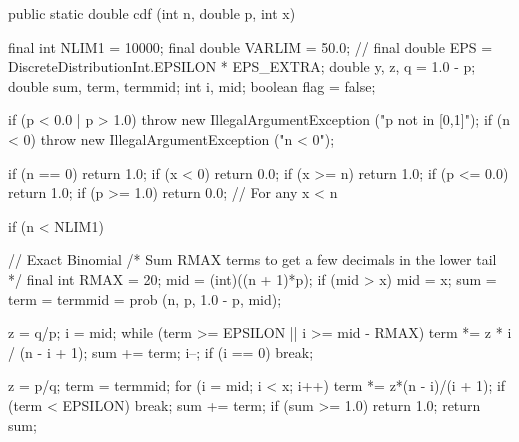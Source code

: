 \begin{code}

   public static double cdf (int n, double p, int x)\begin{hide} {
      final int NLIM1 = 10000;
      final double VARLIM = 50.0;
//      final double EPS = DiscreteDistributionInt.EPSILON * EPS_EXTRA;
      double y, z, q = 1.0 - p;
      double sum, term, termmid;
      int i, mid;
      boolean flag = false;

      if (p < 0.0 | p > 1.0)
        throw new IllegalArgumentException ("p not in [0,1]");
      if (n < 0)
        throw new IllegalArgumentException ("n < 0");

      if (n == 0)
         return 1.0;
      if (x < 0)
         return 0.0;
      if (x >= n)
         return 1.0;
      if (p <= 0.0)
         return 1.0;
      if (p >= 1.0)
         return 0.0;                 // For any x < n

      if (n < NLIM1) {               // Exact Binomial
         /* Sum RMAX terms to get a few decimals in the lower tail */
         final int RMAX = 20;
         mid = (int)((n + 1)*p);
         if (mid > x)
            mid = x;
         sum = term = termmid = prob (n, p, 1.0 - p, mid);

         z = q/p;
            i = mid;
            while (term >= EPSILON || i >= mid - RMAX) {
            term *= z * i / (n - i + 1);
            sum += term;
            i--;
            if (i == 0) break;
         }

         z = p/q;
         term = termmid;
         for (i = mid; i < x; i++) {
            term *= z*(n - i)/(i + 1);
            if (term < EPSILON)
               break;
            sum += term;
         }
         if (sum >= 1.0) return 1.0;
         return sum;

}}
\end{hide}
\end{code}
